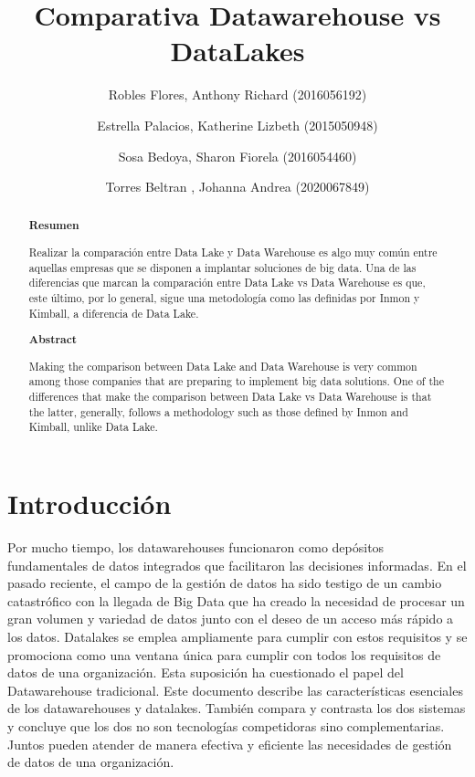 \documentclass[%
 reprint,
 amsmath,amssymb,
 aps,
]{revtex4-1}
\begin{document}
\title{Comparativa Datawarehouse vs DataLakes}
\author{Robles Flores, Anthony Richard	               (2016056192)}
\author{Estrella Palacios, Katherine Lizbeth			(2015050948)}
\author{Sosa Bedoya, Sharon Fiorela					(2016054460)}
\author{Torres Beltran , Johanna Andrea				(2020067849)}

		
%

\begin{abstract}
\begin{center}
\textbf{Resumen}
\end{center}
Realizar la comparación entre Data Lake y Data Warehouse es algo muy común entre aquellas empresas que se disponen a implantar soluciones de big data. Una de las diferencias que marcan la comparación entre Data Lake vs Data Warehouse es que, este último, por lo general, sigue una metodología como las definidas por Inmon y Kimball, a diferencia de Data Lake.
\\

\begin{center}
\textbf{Abstract}
\end{center}
Making the comparison between Data Lake and Data Warehouse is very common among those companies that are preparing to implement big data solutions. One of the differences that make the comparison between Data Lake vs Data Warehouse is that the latter, generally, follows a methodology such as those defined by Inmon and Kimball, unlike Data Lake.
\\
\end{abstract}



\maketitle


\section {Introducción}\label{sec:1}

Por mucho tiempo, los datawarehouses funcionaron como depósitos fundamentales de datos integrados que facilitaron las decisiones informadas. En el pasado reciente, el campo de la gestión de datos ha sido testigo de un cambio catastrófico con la llegada de Big Data que ha creado la necesidad de procesar un gran volumen y variedad de datos junto con el deseo de un acceso más rápido a los datos.
Datalakes se emplea ampliamente para cumplir con estos requisitos y se promociona como una ventana única para cumplir con todos los requisitos de datos de una organización. Esta suposición ha cuestionado el papel del Datawarehouse tradicional. Este documento describe las características esenciales de los datawarehouses y datalakes. También compara y contrasta los dos sistemas y concluye que los dos no son tecnologías competidoras sino complementarias. Juntos pueden atender de manera efectiva y eficiente las necesidades de gestión de datos de una organización.
\end{document}
